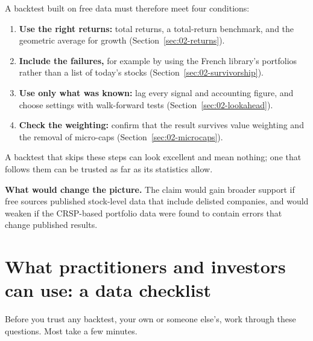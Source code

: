 A backtest built on free data must therefore meet four conditions:

\begin{enumerate}
  \item \textbf{Use the right returns:} total returns, a total-return benchmark, and the geometric average for growth (Section~\ref{sec:02-returns}).
  \item \textbf{Include the failures,} for example by using the French library's portfolios rather than a list of today's stocks (Section~\ref{sec:02-survivorship}).
  \item \textbf{Use only what was known:} lag every signal and accounting figure, and choose settings with walk-forward tests (Section~\ref{sec:02-lookahead}).
  \item \textbf{Check the weighting:} confirm that the result survives value weighting and the removal of micro-caps (Section~\ref{sec:02-microcaps}).
\end{enumerate}

A backtest that skips these steps can look excellent and mean nothing; one that follows them can be trusted as far as its statistics allow.

\textbf{What would change the picture.} The claim would gain broader support if free sources published stock-level data that include delisted companies, and would weaken if the CRSP-based portfolio data were found to contain errors that change published results.

\section{What practitioners and investors can use: a data checklist}
\label{sec:02-checklist}

Before you trust any backtest, your own or someone else's, work through these questions. Most take a few minutes.

